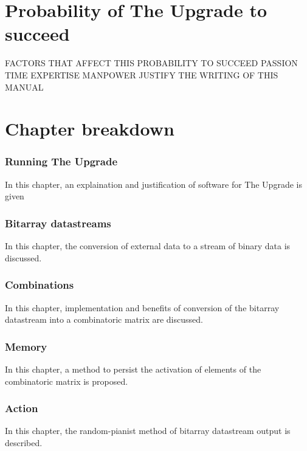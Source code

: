 \section{Probability of The Upgrade to succeed}
FACTORS THAT AFFECT THIS PROBABILITY TO SUCCEED
PASSION
TIME
EXPERTISE
MANPOWER
JUSTIFY THE WRITING OF THIS MANUAL 
\section{Chapter breakdown}
\subsubsection{Running The Upgrade}
In this chapter, an explaination and justification of software for The Upgrade is given
\subsubsection{Bitarray datastreams}
In this chapter, the conversion of external data to a stream of binary data is discussed.
\subsubsection{Combinations}
In this chapter, implementation and benefits of conversion of the bitarray datastream into a combinatoric matrix are discussed.
\subsubsection{Memory}
In this chapter, a method to persist the activation of  elements of the combinatoric matrix is proposed.
\subsubsection{Action}
In this chapter, the random-pianist method of bitarray datastream output is described.
